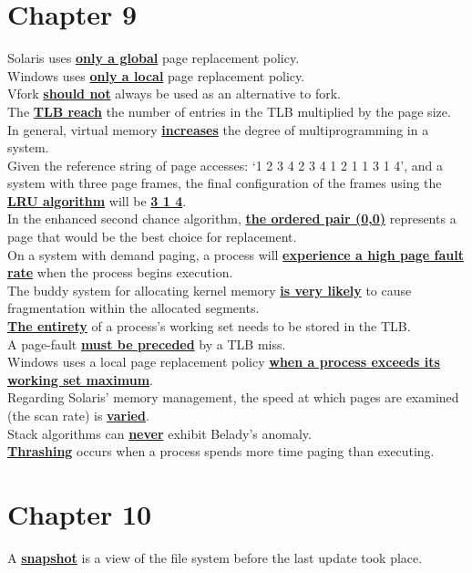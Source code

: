 \documentclass[10pt]{article}
\newcommand{\qw}[1]{\textbf{\ul{#1}}}
\begin{document}
\section*{\centering Chapter 9}
Solaris uses \qw{only a global} page replacement policy.\\[2mm]
Windows uses \qw{only a local} page replacement policy.\\[2mm]
Vfork \qw{should not} always be used as an alternative to fork.\\[2mm]
The \qw{TLB reach} the number of entries in the TLB multiplied by the page size.\\[2mm]
In general, virtual memory \qw{increases} the degree of multiprogramming in a system.\\[2mm]
Given the reference string of page accesses: `1 2 3 4 2 3 4 1 2 1 1 3 1 4', and a system with three page frames, the final configuration of the frames using the \qw{LRU algorithm} will be \qw{3 1 4}.\\[2mm]
In the enhanced second chance algorithm, \qw{the ordered pair (0,0)} represents a page that would be the best choice for replacement.\\[2mm]
On a system with demand paging, a process will \qw{experience a high page fault rate} when the process begins execution.\\[2mm]
The buddy system for allocating kernel memory \qw{is very likely} to cause fragmentation within the allocated segments.\\[2mm]
\qw{The entirety} of a process's working set needs to be stored in the TLB.\\[2mm]
A page-fault \qw{must be preceded} by a TLB miss.\\[2mm]
Windows uses a local page replacement policy \qw{when a process exceeds its working set maximum}.\\[2mm]
Regarding Solaris' memory management, the speed at which pages are examined (the scan rate) is \qw{varied}.\\[2mm]
Stack algorithms can \qw{never} exhibit Belady's anomaly.\\[2mm]
\qw{Thrashing} occurs when a process spends more time paging than executing.\\[2mm]

\section*{\centering Chapter 10}
A \qw{snapshot} is a view of the file system before the last update took place.\\[2mm]
\end{document}

